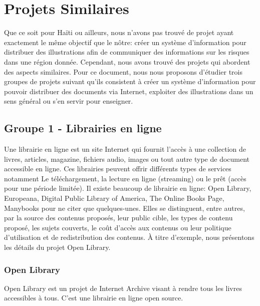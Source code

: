 \section{Projets Similaires}
	Que ce soit pour Ha\"iti ou ailleurs, nous n'avons pas trouv\'e de projet ayant exactement le m\^eme objectif que le n\^otre: cr\'eer un syst\`eme d'information pour distribuer des illustrations afin de communiquer des informations sur les risques dans une r\'egion donn\'ee. Cependant, nous avons trouv\'e des projets qui abordent des aspects similaires. Pour ce document, nous nous proposons d'\'etudier trois groupes de projets suivant qu'ils consistent \`a cr\'eer un syst\`eme d'information pour pouvoir distribuer des documents via Internet, exploiter des illustrations dans un sens g\'en\'eral ou s'en servir pour enseigner.


	\subsection{Groupe 1 - Librairies en ligne}
		Une librairie en ligne est un site Internet qui fournit l'acc\`es \`a une collection de livres, articles, magazine, fichiers audio, images ou tout autre type de document accessible en ligne. Ces librairies peuvent offrir diff\'erents types de services notamment Le t\'el\'echargement, la lecture en ligne (streaming) ou le pr\^et (acc\`es pour une p\'eriode limit\'ee). Il existe beaucoup de librairie en ligne: Open Library, Europeana, Digital Public Library of America, The Online Books Page, Manybooks pour ne citer que quelques-unes. Elles se distinguent, entre autres, par la source des contenus propos\'es, leur public cible, les types de contenu propos\'e, les sujets couverts, le co\^ut d'acc\`es aux contenus ou leur politique d'utilisation et de redistribution des contenus. \`A titre d'exemple, nous pr\'esentons les d\'etails du projet Open Library.

		\subsubsection{Open Library}
			Open Library est un projet de Internet Archive\cite{InternetArchive} visant \`a rendre tous les livres accessibles \`a tous\cite{OpenLibVision}. C'est une librairie en ligne open source.\\


